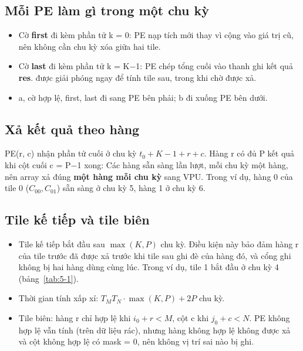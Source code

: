 \documentclass[10pt,a4paper]{article}
\begin{document}
\subsection{Mỗi PE làm gì trong một chu kỳ}
\eqbox{\[
sum = \begin{cases} a\cdot b & \text{nếu } first \\ acc + a\cdot b & \text{ngược lại} \end{cases}
\qquad acc \leftarrow sum, \qquad \text{nếu } last:\ res \leftarrow sum.
\]}
\begin{itemize}
\item Cờ \textbf{first} đi kèm phần tử k = 0: PE nạp tích mới thay vì cộng vào giá trị cũ, nên không cần chu kỳ xóa giữa hai tile.
\item Cờ \textbf{last} đi kèm phần tử k = K−1: PE chép tổng cuối vào thanh ghi kết quả \textbf{res}.  được giải phóng ngay để tính tile sau, trong khi  chờ được xả.
\item a, cờ hợp lệ, first, last đi sang PE bên phải; b đi xuống PE bên dưới.
\end{itemize}

\subsection{Xả kết quả theo hàng}
PE(r, c) nhận phần tử cuối ở chu kỳ $t_0 + K - 1 + r + c$. Hàng r có đủ P kết quả khi cột cuối c = P−1 xong:
Các hàng sẵn sàng lần lượt, mỗi chu kỳ một hàng, nên array xả đúng \textbf{một hàng mỗi chu kỳ} sang VPU. Trong ví dụ, hàng 0 của tile 0 ($C_{00}, C_{01}$) sẵn sàng ở chu kỳ 5, hàng 1 ở chu kỳ 6.

\subsection{Tile kế tiếp và tile biên}
\begin{itemize}
\item Tile kế tiếp bắt đầu sau $\max(K, P)$ chu kỳ. Điều kiện này bảo đảm hàng r của tile trước đã được xả trước khi tile sau ghi đè  của hàng đó, và cổng ghi không bị hai hàng dùng cùng lúc. Trong ví dụ, tile 1 bắt đầu ở chu kỳ 4 (bảng~\ref{tab:5-1}).
\item Thời gian tính xấp xỉ: $T_M T_N \cdot \max(K, P) + 2P$ chu kỳ.
\item Tile biên: hàng r chỉ hợp lệ khi $i_0 + r < M$, cột c khi $j_0 + c < N$. PE không hợp lệ vẫn tính (trên dữ liệu rác), nhưng hàng không hợp lệ không được xả và cột không hợp lệ có mask = 0, nên không vị trí sai nào bị ghi.
\end{itemize}
\end{document}
